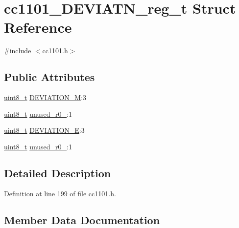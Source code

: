 \hypertarget{structcc1101___d_e_v_i_a_t_n__reg__t}{}\section{cc1101\+\_\+\+D\+E\+V\+I\+A\+T\+N\+\_\+reg\+\_\+t Struct Reference}
\label{structcc1101___d_e_v_i_a_t_n__reg__t}


{\ttfamily \#include $<$cc1101.\+h$>$}

\subsection*{Public Attributes}
\begin{DoxyCompactItemize}
\item 
\hyperlink{_p_e___types_8h_aba7bc1797add20fe3efdf37ced1182c5}{uint8\+\_\+t} \hyperlink{structcc1101___d_e_v_i_a_t_n__reg__t_a4fcd7ef47b37ed3880a333a02d46728e}{D\+E\+V\+I\+A\+T\+I\+O\+N\+\_\+M}\+:3
\item 
\hyperlink{_p_e___types_8h_aba7bc1797add20fe3efdf37ced1182c5}{uint8\+\_\+t} \hyperlink{structcc1101___d_e_v_i_a_t_n__reg__t_a89dc7e642f1bcc5fe8ff33f5c18333b0}{unused\+\_\+r0\+\_}\+:1
\item 
\hyperlink{_p_e___types_8h_aba7bc1797add20fe3efdf37ced1182c5}{uint8\+\_\+t} \hyperlink{structcc1101___d_e_v_i_a_t_n__reg__t_a5f4a0e09f6a82b0c9210869d395ae699}{D\+E\+V\+I\+A\+T\+I\+O\+N\+\_\+E}\+:3
\item 
\hyperlink{_p_e___types_8h_aba7bc1797add20fe3efdf37ced1182c5}{uint8\+\_\+t} \hyperlink{structcc1101___d_e_v_i_a_t_n__reg__t_aa5462e40708c2f9c154f219becffb181}{unused\+\_\+r0\+\_}\+:1
\end{DoxyCompactItemize}


\subsection{Detailed Description}


Definition at line 199 of file cc1101.\+h.



\subsection{Member Data Documentation}

